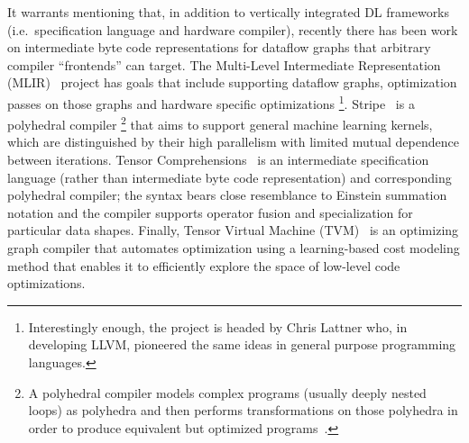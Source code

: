 It warrants mentioning that, in addition to vertically integrated DL frameworks (i.e.\ specification language and hardware compiler), recently there has been work on intermediate byte code representations for dataflow graphs that arbitrary compiler ``frontends'' can target.
The Multi-Level Intermediate Representation (MLIR)~\cite{lattner2020mlir} project has goals that include supporting dataflow graphs, optimization passes on those graphs and hardware specific optimizations%
\footnote{Interestingly enough, the project is headed by Chris Lattner who, in developing LLVM, pioneered the same ideas in general purpose programming languages.}.
Stripe~\cite{zerrell2019stripe} is a polyhedral compiler%
\footnote{A polyhedral compiler models complex programs (usually deeply nested loops) as polyhedra and then performs transformations on those polyhedra in order to produce equivalent but optimized programs~\cite{Griebl98codegeneration}.}
that aims to support general machine learning kernels, which are distinguished by their high parallelism with limited mutual dependence between iterations.
Tensor Comprehensions~\cite{vasilache2018tensor} is an intermediate specification language (rather than intermediate byte code representation) and corresponding polyhedral compiler;
the syntax bears close resemblance to Einstein summation notation and the compiler supports operator fusion and specialization for particular data shapes.
Finally, Tensor Virtual Machine (TVM)~\cite{10.5555/3291168.3291211} is an optimizing graph compiler that automates optimization using a learning-based cost modeling method that enables it to efficiently explore the space of low-level code optimizations.